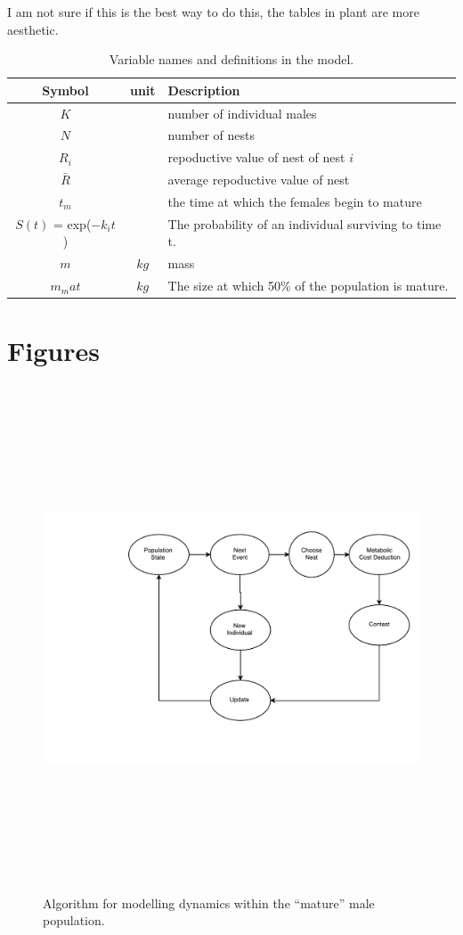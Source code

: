 \documentclass[a4paper,11pt]{article}
\begin{document}
I am not sure if this is the best way to do this, the tables in plant are more aesthetic. 
\begin{table}[h!]
    \caption{Variable names and definitions in the model.}
    \centering
    \begin{tabular}{c | c | l }
        \hline
        Symbol & unit & Description\\
        \hline
        \hline
        $K$ & & number of individual males \\
        $N$ & & number of nests \\
        $R_i$ & & repoductive value of nest of nest $i$\\
        $\bar{R}$ & & average repoductive value of nest\\
        \hline
        $t_m$ & & the time at which the females begin to mature\\
        $S(t)$ = exp($-k_it$) & & The probability of an individual surviving to time t.\\
        \hline
        $m$ & $kg$ & mass\\
        $m_mat$ & $kg$ & The size at which 50\% of the population is mature.\\ 
        \hline
    \end{tabular}
\end{table}

\section{Figures}

\begin{figure}[h!]
\centering
\includegraphics[width=15cm,height=15cm,keepaspectratio]{figures/event_algorithm}
\caption{Algorithm for modelling dynamics within the ``mature'' male population.}
\label{fig:events}
\end{figure}
\clearpage
\end{document}
